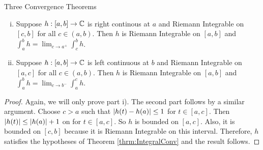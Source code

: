 \begin{section}{Three Convergence Theorems}
\begin{cor}\label{cor:IntegralConv}
	\begin{enumerate}[i)]
	\item
	Suppose $h:[a,b] \to \mathbb{C}$ is right continous at $a$ and Riemann
	Integrable on $[c,b]$ for all $c \in (a,b)$. Then $h$ is Riemann
	Integrable on $[a,b]$ and $\int_a^b h =
	\lim_{c \rightarrow a^+}\int_c^b h$.
	
	\item
	Suppose $h:[a,b] \to \mathbb{C}$ is left continuous at $b$ and Riemann
	Integrable on $[a,c]$ for all $c \in (a,b)$. Then $h$ is Riemann
	Integrable on $[a,b]$ and $\int_a^b h =
	\lim_{c \rightarrow b^-}\int_a^c h$.
	\end{enumerate}
\end{cor}

\begin{proof}
	Again, we will only prove part i). The second part follows by a similar
	argument.
	Choose $c > a$ such that $\left \vert {h(t) - h(a)} \right \vert \leq 1$ for $t \in [a,c]$.
	Then $\left \vert {h(t)} \right \vert \leq \left \vert {h(a)} \right \vert + 1$ on for $t \in [a,c]$. So $h$
	is bounded on $[a,c]$. Also, it is bounded on $[c,b]$ because it is Riemann
	Integrable on this interval. Therefore, $h$ satisfies the hypotheses of
	Theorem \ref{thrm:IntegralConv} and the result follows.
\end{proof}

\end{section}